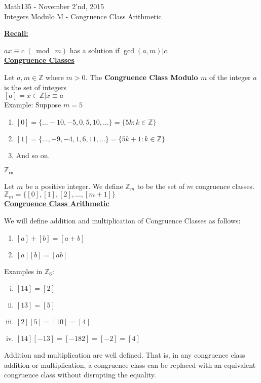 \documentclass{letter}
\begin{document}
	\begin{center}
		\LARGE Math135 - November 2'nd, 2015\\
		\large Integers Modulo M - Congruence Class Arithmetic
	\end{center}
	\vspace{0.25 in}
	\underline{\textbf{Recall:}}
	
	$ax \equiv c \;(\bmod\; m)$ has a solution if $\gcd(a, m) \vert c$.\\
		
	\underline{\textbf{Congruence Classes}}
	
	Let $a, m \in \mathbb{Z}$ where $m > 0$. The  \textbf{Congruence Class Modulo $m$} of the integer $a$ is the set of integers\\
	$[a] = {x \in \mathbb{Z} \vert x \equiv a}$\\
	
	Example: Suppose $m = 5$
	\begin{enumerate}[ ]
		\item $[0] = \lbrace\dots -10, -5, 0, 5, 10, \dots\rbrace = \lbrace5k : k \in \mathbb{Z}\rbrace$
		\item $[1] = \lbrace\dots, -9, -4, 1, 6, 11, \dots\rbrace = \lbrace 5k+1 : k \in \mathbb{Z}\rbrace$
		\item And so on.
	\end{enumerate}
	\underline{$\mathbf{\mathbb{Z}_m}$}
	
	Let $m $ be a positive integer. We define $\mathbb{Z}_m$ to be the set of $m$ congruence classes.\\

	$\mathbb{Z}_m = \lbrace[0], [1], [2], \dots, [m+1]\rbrace$\\

	\underline{\textbf{Congruence Class Arithmetic}}
	
	We will define addition and multiplication of Congruence Classes as follows:
	\begin{enumerate} [ ]
		\item $[a] + [b] = [a + b]$
		\item $[a][b] = [ab]$
	\end{enumerate}
	
	Examples in $\mathbb{Z}_6$:
	\begin{enumerate} [i)]
		\item $[14] = [2]$
		\item $[13] = [5]$
		\item $[2][5] = [10] = [4]$
		\item $[14][-13] = [-182] = [-2] = [4]$
	\end{enumerate}
	Addition and multiplication are well defined. That is, in any congruence class addition or multiplication, a congruence class can be replaced with an equivalent congruence class without disrupting the equality.
	
\end{document}
